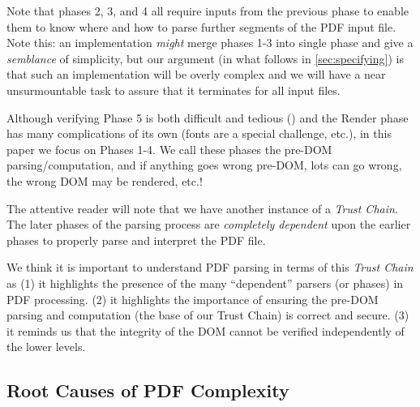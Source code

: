 Note that phases 2, 3, and 4
all require inputs from the previous phase to enable them to know where and
how to parse further segments of the PDF input file.
%
Note this: an implementation \emph{might} merge phases 1-3 into single phase
and give a \emph{semblance} of simplicity, but our argument (in what
follows in \cref{sec:specifying}) is that such an implementation will be
overly complex and we will have a near unsurmountable task to assure that it
terminates for all input files.


Although verifying Phase 5 is both difficult and tedious
()
and the Render phase has many complications of its own (fonts are
a special challenge, etc.), in this paper we focus on Phases 1-4.
We call these phases the pre-DOM parsing/computation, and if anything
goes wrong pre-DOM, lots can go wrong, the wrong DOM may be rendered, etc.!

The attentive reader will note that we have another instance of a \emph{Trust
Chain}.  The later phases of the parsing process are \emph{completely
dependent} upon the earlier phases to properly parse and interpret the PDF
file.


We think it is important to understand PDF parsing in terms of this
\emph{Trust Chain} as
%
(1) it highlights the presence of the many ``dependent'' parsers (or phases)
in PDF processing.
%
(2) it highlights the importance of ensuring the pre-DOM parsing and
computation (the base of our Trust Chain) is correct and secure.
%
(3) it reminds us that the integrity of the DOM cannot be verified
independently of the lower levels.


\subsection{Root Causes of PDF Complexity}

